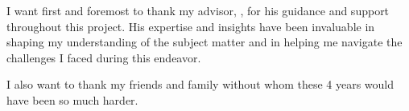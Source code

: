 \vspace*{7cm}
\begin{center}
I want first and foremost to thank my advisor, \VARadviser,
for his guidance and support throughout this project.
His expertise and insights have been invaluable in shaping
my understanding of the subject matter
and in helping me navigate the challenges I faced during this endeavor.
\end{center}
\vspace{0.6cm}
\begin{center}
I also want to thank my friends and family without whom these
4 years would have been so much harder.
\end{center}
